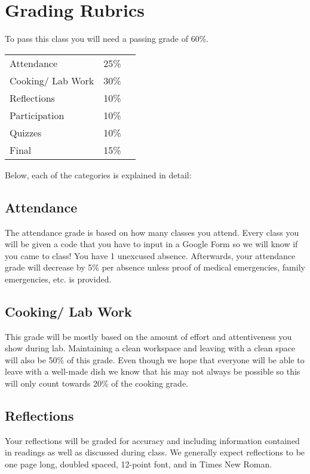 \documentclass{article}
\begin{document}
\section{Grading Rubrics} 

To pass this class you will need a passing grade of 60\%. 

\begin{table}[h]
\begin{tabular}{lll}
 Attendance &  25\% \\
 Cooking/ Lab Work & 30\%  \\
 Reflections &  10\%  \\
 Participation & 10\% \\ 
 Quizzes & 10\% \\
 Final & 15\%
\end{tabular}
\end{table}   

\noindent Below, each of the categories is explained in detail:

\subsection{Attendance}
 The attendance grade is based on how many classes you attend. Every class you will be given a code that you have to input in a Google Form so we will know if you came to class! You have 1 unexcused absence. Afterwards, your attendance grade will decrease by 5\% per absence unless proof of medical emergencies, family emergencies, etc. is provided. 

\subsection{Cooking/ Lab Work} This grade will be mostly based on the amount of effort and attentiveness you show during lab. Maintaining a clean workspace and leaving with a clean space will also be 50\% of this grade. Even though we hope that everyone will be able to leave with a well-made dish we know that his may not always be possible so this will only count towards 20\% of the cooking grade.

\subsection{Reflections} Your reflections will be graded for accuracy and including information contained in readings as well as discussed during class. We generally expect reflections to be one page long, doubled spaced, 12-point font, and in Times New Roman. 
\end{document}
